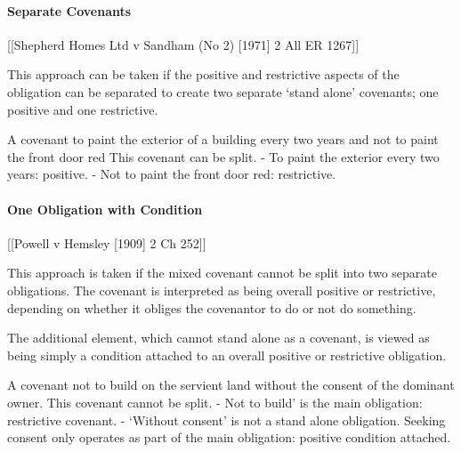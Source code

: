 \documentclass[
]{article}
\newenvironment{Shaded}{}{}
\newcommand{\NormalTok}[1]{#1}
\begin{document}
\hypertarget{separate-covenants}{%
\paragraph{Separate Covenants}\label{separate-covenants}}

{[}{[}Shepherd Homes Ltd v Sandham (No 2) {[}1971{]} 2 All ER 1267{]}{]}

This approach can be taken if the positive and restrictive aspects of
the obligation can be separated to create two separate `stand alone'
covenants; one positive and one restrictive.

\begin{Shaded}
\begin{Highlighting}[]
\NormalTok{A covenant to paint the exterior of a building every two years and not to paint the front door red}
\NormalTok{This covenant can be split.}
\NormalTok{{-} To paint the exterior every two years: positive.}
\NormalTok{{-} Not to paint the front door red: restrictive.}
\end{Highlighting}
\end{Shaded}

\hypertarget{one-obligation-with-condition}{%
\paragraph{One Obligation with
Condition}\label{one-obligation-with-condition}}

{[}{[}Powell v Hemsley {[}1909{]} 2 Ch 252{]}{]}

This approach is taken if the mixed covenant cannot be split into two
separate obligations. The covenant is interpreted as being overall
positive or restrictive, depending on whether it obliges the covenantor
to do or not do something.

The additional element, which cannot stand alone as a covenant, is
viewed as being simply a condition attached to an overall positive or
restrictive obligation.

\begin{Shaded}
\begin{Highlighting}[]
\NormalTok{A covenant not to build on the servient land without the consent of the dominant owner. This covenant cannot be split. }
\NormalTok{{-} Not to build’ is the main obligation: restrictive covenant.}
\NormalTok{{-} ‘Without consent’ is not a stand alone obligation. Seeking consent only operates as part of the main obligation: positive condition attached.}
\end{Highlighting}
\end{Shaded}
\end{document}
